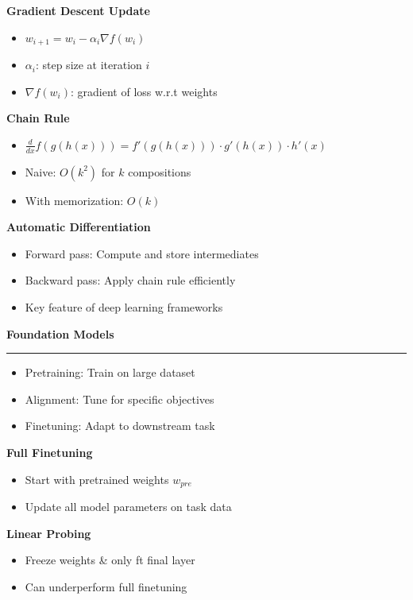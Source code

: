 \documentclass[8pt,letter,landscape]{article}
\newcommand{\sectiontitle}[1]{\textbf{\large #1}\vspace{0.2em}\hrule\vspace{0.5em}}
\begin{document}
\begin{multicols*}{3}
\textbf{Gradient Descent Update}

\begin{itemize}[leftmargin=*,nosep]
    \item $w_{i+1} = w_i - \alpha_i \nabla f(w_i)$
    \item $\alpha_i$: step size at iteration $i$
    \item $\nabla f(w_i)$: gradient of loss w.r.t weights
\end{itemize}

\textbf{Chain Rule}

\begin{itemize}[leftmargin=*,nosep]
    \item $\frac{d}{dx}f(g(h(x))) = f'(g(h(x))) \cdot g'(h(x)) \cdot h'(x)$
    \item Naive: $O(k^2)$ for $k$ compositions
    \item With memorization: $O(k)$
\end{itemize}

\textbf{Automatic Differentiation}

\begin{itemize}[leftmargin=*,nosep]
    \item Forward pass: Compute and store intermediates
    \item Backward pass: Apply chain rule efficiently
    \item Key feature of deep learning frameworks
\end{itemize}

\sectiontitle{Foundation Models}

\begin{itemize}[leftmargin=*,nosep]
    \item Pretraining: Train on large dataset
    \item Alignment: Tune for specific objectives
    \item Finetuning: Adapt to downstream task
\end{itemize}

\textbf{Full Finetuning}
\begin{itemize}[leftmargin=*,nosep]
    \item Start with pretrained weights $w_{pre}$
    \item Update all model parameters on task data
\end{itemize}

\textbf{Linear Probing}
\begin{itemize}[leftmargin=*,nosep]
    \item Freeze weights \& only ft final layer
    \item Can underperform full finetuning
\end{itemize}


\end{multicols*}
\end{document}
